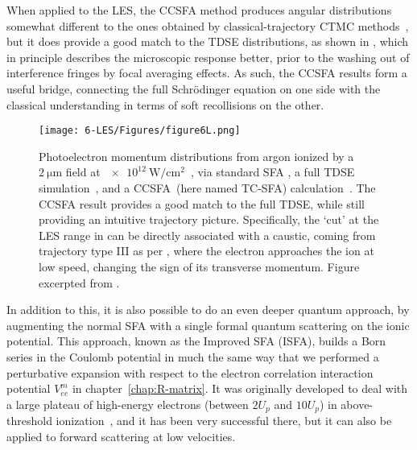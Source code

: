 When applied to the LES, the CCSFA method produces angular distributions somewhat different to the ones obtained by classical-trajectory CTMC methods~\cite{ yan_TCSFA_caustics}, but it does provide a good match to the TDSE distributions, as shown in , which in principle describes the microscopic response better, prior to the washing out of interference fringes by focal averaging effects. As such, the CCSFA results form a useful bridge, connecting the full Schrödinger equation on one side with the classical understanding in terms of soft recollisions on the other.




\begin{figure}[htb]
  \centering
  \subfigure{\label{f6-yan-original-figure-a}}
  \subfigure{\label{f6-yan-original-figure-b}}
  \subfigure{\label{f6-yan-original-figure-c}}
  \subfigure{\label{f6-yan-original-figure-d}}
  \subfigure{\label{f6-yan-original-figure-e}}
  \texttt{[image: 6-LES/Figures/figure6L.png]}
  \caption[
  CCSFA analysis of the Low-Energy Structures, as performed by T.-M. Yan~et~al.
  ]{
  Photoelectron momentum distributions from argon ionized by a $\SI{2}{\micro\meter}$ field at $\SI{e12}{\watt/\centi\meter^2}$~\cite{ yan_TCSFA_caustics}, via standard SFA \protect{}, a full TDSE simulation~\protect{}, and a CCSFA~(here named TC-SFA) calculation~\protect{}. The CCSFA result provides a good match to the full TDSE, while still providing an intuitive trajectory picture. Specifically, the `cut' at the LES range in \protect{} can be directly associated with a caustic, coming from trajectory type III as per \protect{}, where the electron approaches the ion at low speed, changing the sign of its transverse momentum.
  Figure excerpted from .
  }
\label{f6-yan-original-figure}
\end{figure}





In addition to this, it is also possible to do an even deeper quantum approach, by augmenting the normal SFA with a single formal quantum scattering on the ionic potential. This approach, known as the Improved SFA (ISFA), builds a Born series in the Coulomb potential in much the same way that we performed a perturbative expansion with respect to the electron correlation interaction potential $V_{ee}^m$ in chapter~\ref{chap:R-matrix}. It was originally developed to deal with a large plateau of high-energy electrons (between $2U_p$ and $10U_p$) in above-threshold ionization~\cite{goreslavskii_ISFA-standard_1998, milosevic_ISFA-standard_2007}, and it has been very successful there, but it can also be applied to forward scattering at low velocities.

